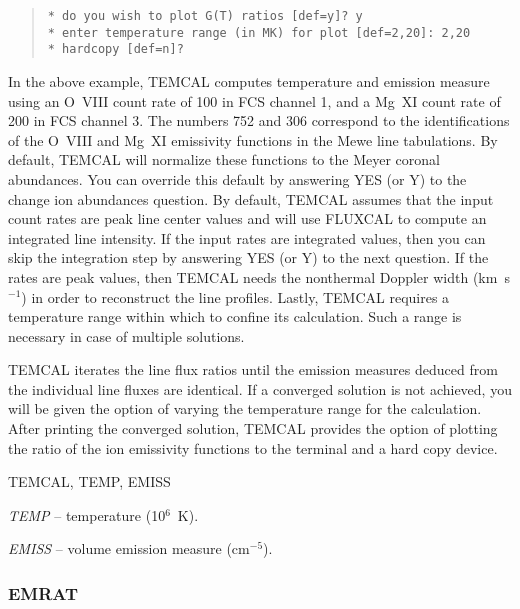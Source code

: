 {{{\begin{quote}
\begin{verbatim}
* do you wish to plot G(T) ratios [def=y]? y
* enter temperature range (in MK) for plot [def=2,20]: 2,20
* hardcopy [def=n]?
\end{verbatim}
\end{quote}
In the above example, TEMCAL computes temperature and emission measure using an
O~VIII count rate of 100 in FCS channel 1, and a Mg~XI count rate of 200 in FCS
channel 3. The numbers 752 and 306 correspond to the identifications of the
O~VIII and Mg~XI emissivity functions in the Mewe line tabulations. By default,
TEMCAL will normalize these functions to the Meyer coronal abundances. You  can
override this default by answering YES (or Y) to the change ion abundances
question. By default, TEMCAL assumes that  the input count rates are peak line
center values and will use FLUXCAL to compute an integrated line intensity. If
the input rates are integrated values, then you can skip the integration step
by answering YES (or Y) to the next question. If the rates are peak values,
then  TEMCAL needs the nonthermal Doppler width (km~s$^{-1}$)  in order to
reconstruct the line profiles.  Lastly, TEMCAL requires a temperature range
within which to  confine its calculation. Such a range is necessary in case of
multiple solutions.

TEMCAL iterates the line flux ratios until the emission measures deduced from
the individual line fluxes are identical. If a converged solution is not
achieved, you will be given the option of varying the temperature range for the
calculation. After printing the converged solution, TEMCAL provides the option
of plotting the ratio of the ion emissivity functions to the terminal and a
hard copy device.


TEMCAL, TEMP, EMISS


{\it TEMP} -- temperature (10$^6$~K).

{\it EMISS} -- volume emission measure (cm$^{-5}$).

\subsubsection{EMRAT}

}}}
